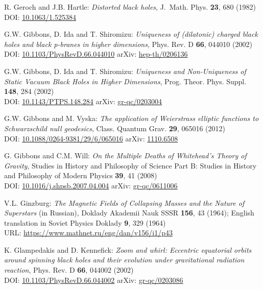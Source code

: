 \begin{thebibliography}{123}
R. Geroch and J.B. Hartle:
{\em Distorted black holes},
J.~Math. Phys. {\bf 23}, 680 (1982)\\
DOI: \href{https://doi.org/10.1063/1.525384}{10.1063/1.525384}

G.W. Gibbons, D. Ida and T. Shiromizu:
{\em Uniqueness of (dilatonic) charged black holes and black p-branes in higher dimensions},
Phys. Rev. D {\bf 66}, 044010 (2002)\\
DOI: \href{https://doi.org/10.1103/PhysRevD.66.044010}{10.1103/PhysRevD.66.044010}\hfill
arXiv: \href{https://arxiv.org/abs/hep-th/0206136}{hep-th/0206136}

G.W. Gibbons, D. Ida and T. Shiromizu:
{\em Uniqueness and Non-Uniqueness of Static Vacuum Black Holes in Higher Dimensions},
Prog. Theor. Phys. Suppl. {\bf 148}, 284 (2002)\\
DOI: \href{https://doi.org/10.1143/PTPS.148.284}{10.1143/PTPS.148.284}\hfill
arXiv: \href{https://arxiv.org/abs/gr-qc/0203004}{gr-qc/0203004}

G.W. Gibbons and M. Vyska:
{\em The application of Weierstrass elliptic functions to Schwarzschild null geodesics},
Class. Quantum Grav. {\bf 29}, 065016 (2012)\\
DOI: \href{https://doi.org/10.1088/0264-9381/29/6/065016}{10.1088/0264-9381/29/6/065016}\hfill
arXiv: \href{https://arxiv.org/abs/1110.6508}{1110.6508}

G. Gibbons and C.M. Will: {\em On the Multiple Deaths of Whitehead's Theory of Gravity},
Studies in History and Philosophy of Science Part B: Studies in History and Philosophy of Modern Physics {\bf 39}, 41 (2008)\\
DOI: \href{https://doi.org/10.1016/j.shpsb.2007.04.004}{10.1016/j.shpsb.2007.04.004}\hfill
arXiv: \href{https://arxiv.org/abs/gr-qc/0611006}{gr-qc/0611006}

V.L. Ginzburg:
{\em The Magnetic Fields of Collapsing Masses and the Nature of Superstars}
(in Russian),
Doklady Akademii Nauk SSSR {\bf 156}, 43 (1964); English translation in
Soviet Physics Doklady {\bf 9}, 329 (1964)\\
URL: \url{https://www.mathnet.ru/eng/dan/v156/i1/p43}

K. Glampedakis and D. Kennefick:
{\em Zoom and whirl: Eccentric equatorial orbits around spinning black holes and their evolution under gravitational radiation reaction},
Phys. Rev. D {\bf 66}, 044002 (2002)\\
DOI: \href{https://doi.org/10.1103/PhysRevD.66.044002}{10.1103/PhysRevD.66.044002}\hfill
arXiv: \href{https://arxiv.org/abs/gr-qc/0203086}{gr-qc/0203086}


\end{thebibliography}
